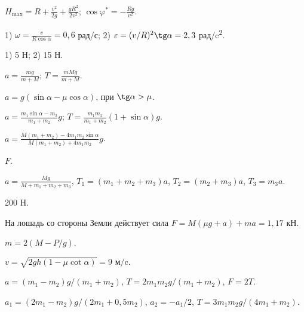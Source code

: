 \begin{Answer}{56}
$H_{\max} = R + \frac{v^2}{2g} + \frac{gR^2}{2v^2}$; $\cos \varphi^{*} = - \frac{Rg}{v^2}$.
\end{Answer}
\begin{Answer}{57}
1) $\omega = \frac{v}{R \cos \alpha} = 0,6$ рад/с; 2) $\varepsilon = (v/R)^2 \tg \alpha = 2,3$ рад/c\textsuperscript{2}.
\end{Answer}
\begin{Answer}{58}
1) 5 Н; 2) 15 Н.
\end{Answer}
\begin{Answer}{59}
$a = \frac{mg}{m+M}$; $T = \frac{mMg}{m+M}$.
\end{Answer}
\begin{Answer}{60}
$a = g (\sin \alpha - \mu \cos \alpha)$, при $\tg \alpha > \mu$.
\end{Answer}
\begin{Answer}{61}
$a = \frac{m_1 \sin \alpha - m_2}{m_1 + m_2}g$; $T = \frac{m_1 m_2}{m_1 + m_2}\left( 1+ \sin \alpha \right)g$.
\end{Answer}
\begin{Answer}{62}
$a = \frac{M(m_1 + m_2) - 4 m_1 m_2 \sin \alpha}{M(m_1 + m_2) + 4 m_1 m_2}g$.
\end{Answer}
\begin{Answer}{63}
$F$.
\end{Answer}
\begin{Answer}{68}
$a = \frac{Mg}{M + m_1 +m_2 +m_3}$, $T_1 = (m_1 +m_2 +m_3)a$, $T_2 = (m_2 +m_3)a$, $T_3 = m_3 a$.
\end{Answer}
\begin{Answer}{69}
200 H.
\end{Answer}
\begin{Answer}{71}
На лошадь со стороны Земли действует сила $F = M(\mu g + a) + ma = 1,17$ кН.
\end{Answer}
\begin{Answer}{72}
$m = 2(M - P/g)$.
\end{Answer}
\begin{Answer}{73}
$ v = \sqrt{2gh(1 - \mu \cot \alpha)} = 9 \textrm{ м/c}.$
\end{Answer}
\begin{Answer}{74}
$a = (m_1 - m_2)g / (m_1 + m_2)$, $T = 2 m_1 m_2 g /(m_1 + m_2)$, $F = 2T$.
\end{Answer}
\begin{Answer}{75}
$a_1 = (2m_1-m_2)g/(2m_1+0,5m_2)$, $a_2 = -a_1/2$, $T=3m_1 m_2g/(4m_1 + m_2)$.
\end{Answer}
